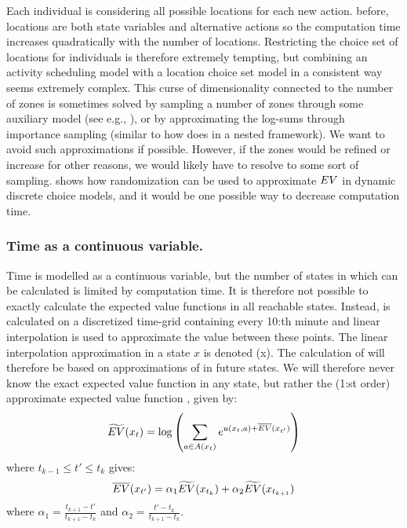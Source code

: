 Each individual is considering all possible locations for each new action. before, locations are both state variables and alternative actions so the computation time increases quadratically with the number of locations. Restricting the choice set of locations for individuals is therefore extremely tempting, but combining an activity scheduling model with a location choice set model in a consistent way seems extremely complex. This curse of dimensionality connected to the number of zones is sometimes solved by sampling a number of zones through some auxiliary model (see e.g., \citep{liao13}), or by approximating the log-sums through importance sampling (similar to how \citealt{Bradley10} does in a nested framework). We want to avoid such approximations if possible. However, if the zones would be refined or increase for other reasons, we would likely have to resolve to some sort of sampling. \citet{Rust97} shows how randomization can be used to approximate $EV$ in dynamic discrete choice models, and it would be one possible way to decrease computation time.

\subsubsection{Time as a continuous variable.}

Time is modelled as a continuous variable, but the number of states in which \eutil can be calculated is limited by computation time. It is therefore not possible to exactly calculate the expected value functions in all reachable states. Instead, \eutil is calculated on a discretized time-grid containing every 10:th minute and linear interpolation is used to approximate the value between these points. The linear interpolation approximation in a state $x$ is denoted \laeutil(x). The calculation of \eutil will therefore be based on approximations of \eutil in future states. We will therefore never know the exact expected value function in any state, but rather the (1:st order) approximate expected value function \aeutil, given by:
\begin{equation} \label{eq:linap1}
\aeutil(x_t) = \log\left(\sum_{a\in A(x_t)}e^{u(x_t,a) + \laeutil(x_{t'})}\right)
\end{equation}
where $t_{k-1} \leq t' \leq t_k $ gives: 
\begin{equation}\label{eq:linap2}
\laeutil(x_{t'}) = \alpha_1 \aeutil(x_{t_k}) + \alpha_2 \aeutil(x_{t_{k+1}})
\end{equation}
where $\alpha_1 = \frac{t_{k+1}-t'}{t_{k+1}-t_k}$ and $\alpha_2 = \frac{t'-t_k}{t_{k+1}-t_k}$.

